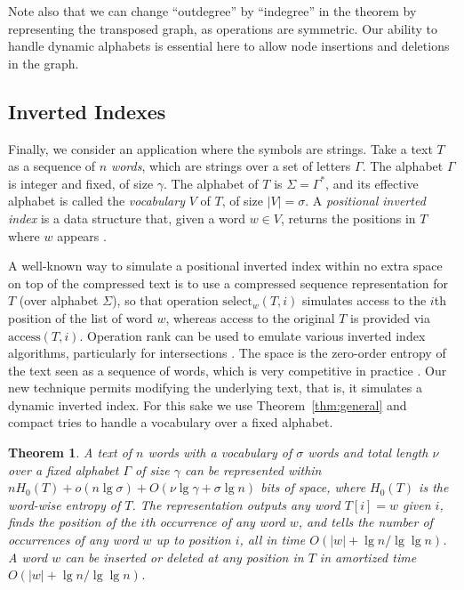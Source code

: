 \documentclass[11pt]{article}
\def\idrm#1{\ensuremath{\mathrm{#1}}}
\newtheorem{theorem}{Theorem}
\newcommand{\sel}{\idrm{select}}
\newcommand{\acc}{\idrm{access}}
\begin{document}
Note also that we can change ``outdegree'' by ``indegree'' in the theorem by
representing the transposed graph, as operations are symmetric. Our ability
to handle dynamic alphabets is essential here to allow node insertions and
deletions in the graph.

\subsection{Inverted Indexes}

Finally, we consider an application where the symbols are strings. Take a
text $T$ as a sequence of $n$ {\em words}, which are strings over a set of
letters $\Gamma$. The alphabet $\Gamma$ is integer and fixed, of size $\gamma$. 
The alphabet of $T$ is $\Sigma = \Gamma^*$, and its effective
alphabet is called the {\em vocabulary} $V$ of $T$, of size $|V|=\sigma$.
A {\em positional inverted index} is a data structure that, given a word
$w \in V$, returns the positions in $T$ where $w$ appears \cite{BYRN11}.

A well-known way to simulate a positional inverted index within no extra space
on top of the compressed text is to use a compressed sequence representation 
for $T$ (over alphabet $\Sigma$), so that operation $\sel_w(T,i)$ simulates
access to the $i$th position of the list of word $w$, whereas access to the
original $T$ is provided via $\acc(T,i)$. Operation rank can be used to 
emulate various inverted index algorithms, particularly for intersections
\cite{BN09}. The space is the zero-order entropy of the text seen as a
sequence of words, which is very competitive in practice \cite{BYRN11}. 
Our new technique
permits modifying the underlying text, that is, it simulates a dynamic
inverted index. For this sake we use Theorem~\ref{thm:general}
and compact tries to handle a vocabulary over a fixed alphabet.

\begin{theorem}
A text of $n$ words with a vocabulary of $\sigma$ words and total length $\nu$
over a fixed alphabet $\Gamma$ of size $\gamma$ can be represented 
within $nH_0(T) + o(n\lg\sigma) + O(\nu\lg\gamma+\sigma\lg n)$
bits of space, where $H_0(T)$ is
the word-wise entropy of $T$.
The representation outputs any word $T[i]=w$
given $i$, finds the position of the $i$th occurrence of any word $w$,
and tells the number of occurrences of any word $w$ up to position $i$, all
in time $O(|w|+\lg n / \lg\lg n)$. A word $w$ can be inserted or deleted at 
any position in $T$ in amortized time $O(|w|+\lg n/\lg\lg n)$.
\end{theorem}
\end{document}

